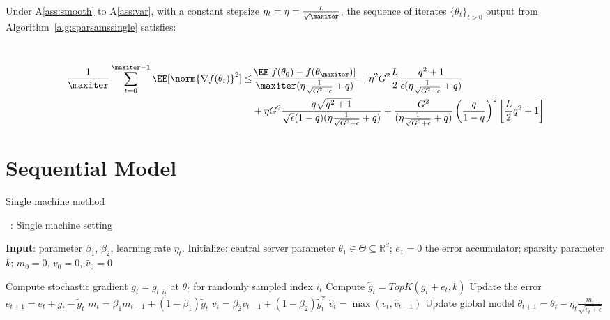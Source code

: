 \documentclass[11pt]{article}
\begin{document}
\begin{Theorem}\label{thm:mainsingle}
Under A\ref{ass:smooth} to A\ref{ass:var}, with a constant stepsize $\eta_t = \eta = \frac{L}{\sqrt{\maxiter}}$, the sequence of iterates $\{\theta_t\}_{t>0}$ output from Algorithm~\ref{alg:sparsamssingle} satisfies:

\ \begin{align}
 \frac{1}{\maxiter}\sum_{t=0}^{\maxiter -1} \EE[\norm{\nabla f(\theta_t)}^2]  \leq &
 \frac{\EE[f(\theta_{0}) - f(\theta_{\maxiter})]}{\maxiter(\eta\frac{1}{\sqrt{G^2+\epsilon}} + q )} + \eta^2 G^2\frac{L}{2} \frac{q^2+1}{\epsilon(\eta\frac{1}{\sqrt{G^2+\epsilon}} + q)} \\
 & + \eta G^2 \frac{q\sqrt{q^2+1}}{\sqrt{\epsilon}(1-q)(\eta\frac{1}{\sqrt{G^2+\epsilon}} + q)}  +  \frac{G^2}{(\eta\frac{1}{\sqrt{G^2+\epsilon}} + q)} \left(\frac{q}{1-q}\right)^2 \left[ \frac{L}{2}q^2 + 1 \right]
  \end{align}
\end{Theorem}

\section{Sequential Model}

Single machine method

\begin{algorithm}[H]
\caption{\algo\ : Single machine setting} \label{alg:sparsamssingle}
\begin{algorithmic}[1]

\STATE \textbf{Input}: parameter $\beta_1$, $\beta_2$, learning rate $\eta_t$. 
\STATE Initialize: central server parameter $\theta_{1} \in \Theta \subseteq \mathbb R^d$; $e_{1}=0$ the error accumulator; sparsity parameter $k$; $m_0=0$, $v_0=0$, $\hat v_0=0$

\STATE  Compute stochastic gradient $g_{t} = g_{t,i_t}$ at $\theta_t$ for randomly sampled index $i_t$\label{line:stochgrad} 
\STATE  Compute $\tilde g_{t}=TopK(g_{t}+e_{t},k)$ \label{line:topksingle} 
\STATE  Update the error $e_{t+1}=e_{t}+g_{t}-\tilde g_{t}$
\STATE $m_t=\beta_1 m_{t-1}+(1-\beta_1)\tilde g_t$
\STATE $v_t=\beta_2 v_{t-1}+(1-\beta_2)\tilde g_t^2$
\STATE $\hat v_t=\max(v_t,\hat v_{t-1})$ \label{line:vsingle}
\STATE Update global model $\theta_{t+1}=\theta_{t}-\eta_t\frac{m_t}{\sqrt{\hat v_t+\epsilon}}$

\ENDFOR
\end{algorithmic}
\end{algorithm}
\end{document}
